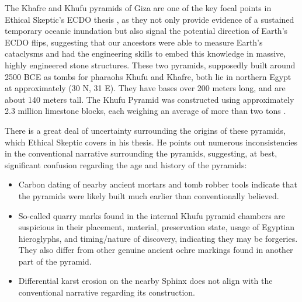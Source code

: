 \documentclass[10pt,twocolumn,letterpaper]{article}
\begin{document}
The Khafre and Khufu pyramids of Giza are one of the key focal points in Ethical Skeptic's ECDO thesis \cite{27}, as they not only provide evidence of a sustained temporary oceanic inundation but also signal the potential direction of Earth's ECDO flips, suggesting that our ancestors were able to measure Earth's cataclysms and had the engineering skills to embed this knowledge in massive, highly engineered stone structures. These two pyramids, supposedly built around 2500 BCE as tombs for pharaohs Khufu and Khafre, both lie in northern Egypt at approximately (30 N, 31 E). They have bases over 200 meters long, and are about 140 meters tall. The Khufu Pyramid was constructed using approximately 2.3 million limestone blocks, each weighing an average of more than two tons \cite{24, 25}.

There is a great deal of uncertainty surrounding the origins of these pyramids, which Ethical Skeptic covers in his thesis. He points out numerous inconsistencies in the conventional narrative surrounding the pyramids, suggesting, at best, significant confusion regarding the age and history of the pyramids:

\begin{flushleft}
\begin{itemize}
    \item Carbon dating of nearby ancient mortars and tomb robber tools indicate that the pyramids were likely built much earlier than conventionally believed.
    \item So-called quarry marks found in the internal Khufu pyramid chambers are suspicious in their placement, material, preservation state, usage of Egyptian hieroglyphs, and timing/nature of discovery, indicating they may be forgeries. They also differ from other genuine ancient ochre markings found in another part of the pyramid.
    \item Differential karst erosion on the nearby Sphinx does not align with the conventional narrative regarding its construction.
\end{itemize}
\end{flushleft}
\end{document}

